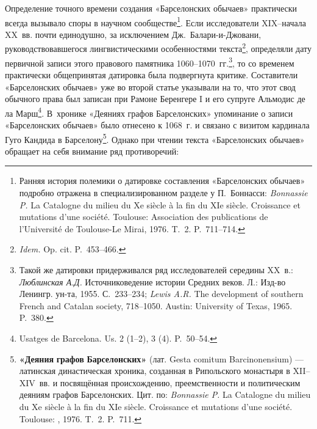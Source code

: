 Определение точного времени создания «Барселонских обычаев» практически всегда вызывало споры в научном сообществе\footnote{Ранняя история полемики о датировке составления «Барселонских обычаев» подробно отражена в специализированном разделе у П.~Боннасси: \emph{Bonnassie P. }La Catalogne du milieu du Xe siècle à la fin du XIe siècle. Croissance et mutations d’une société. Toulouse: Association des publications de l’Université de Toulouse-Le Mirai, 1976. T.~2. P.~711--714.}. Если исследователи XIX--начала XX~вв. почти единодушно, за исключением Дж.~Балари-и-Джовани, руководствовавшегося лингвистическими особенностями текста\footnote{\emph{Idem}\emph{. }Op. cit. P.~453--466.}, определяли дату первичной записи этого правового памятника 1060--1070~гг.\footnote{Такой же датировки придерживался ряд исследователей середины XX~в.:\emph{ Люблинская А.Д. }Источниковедение истории Средних веков. Л.: Изд-во Ленингр. ун-та, 1955. С.~233--234; \emph{Lewis A.R. }The development of southern French and Catalan society, 718--1050. Austin: University of Texas, 1965. P.~380.}, то со временем практически общепринятая датировка была подвергнута критике. Составители «Барселонских обычаев» уже во второй статье указывали на то, что этот свод обычного права был записан при Рамоне Беренгере I и его супруге Альмодис де ла Марш\footnote{Usatges de Barcelona. Us. 2 (1--2), 3 (4). P.~50--54.}. В~хронике «Деяниях графов Барселонских» упоминание о записи «Барселонских обычаев» было отнесено к 1068~г. и связано с визитом кардинала Гуго Кандида в Барселону\footnote{\textbf{«}\textbf{Деяния}\textbf{ }\textbf{графов}\textbf{ }\textbf{Барселонских}\textbf{» }(лат. Gesta comitum Barcinonensium) --- латинская династическая хроника, созданная в Рипольского монастыря в XII--XIV~вв. и посвящённая происхождению, преемственности и политическим деяниям графов Барселонских. Цит. по: \emph{Bonnassie P. }La Catalogne du milieu du Xe siècle à la fin du XIe siècle. Croissance et mutations d’une société. Toulouse: , 1976. T.~2. P.~711.}. Однако при чтении текста «Барселонских обычаев» обращает на себя внимание ряд противоречий:

